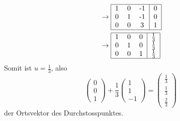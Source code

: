 \begin{loesung}
\begin{align*}
&\rightarrow
\begin{tabular}{|ccc|c|}
\hline
1&0&-1&0\\
0&1&-1&0\\
0&0&3&1\\
\hline
\end{tabular}
\\
&\rightarrow
\begin{tabular}{|ccc|c|}
\hline
1&0&0&$\frac13$\\
0&1&0&$\frac13$\\
0&0&1&$\frac13$\\
\hline
\end{tabular}
\end{align*}
Somit ist $u=\frac13$, also
\[
\begin{pmatrix}0\\0\\1\end{pmatrix}+\frac13\begin{pmatrix}1\\1\\-1\end{pmatrix}
=
\begin{pmatrix}\frac13\\\frac13\\\frac23\end{pmatrix}
\]
der Ortsvektor des Durchstosspunktes.

\end{loesung}

